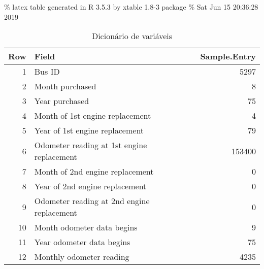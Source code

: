 \documentclass[12pt,a4paper]{article}
\newenvironment{Shaded}{\begin{snugshade}}{\end{snugshade}}
\newcommand{\CommentTok}[1]{\textcolor[rgb]{0.56,0.35,0.01}{\textit{#1}}}
\newcommand{\DataTypeTok}[1]{\textcolor[rgb]{0.13,0.29,0.53}{#1}}
\newcommand{\DecValTok}[1]{\textcolor[rgb]{0.00,0.00,0.81}{#1}}
\newcommand{\KeywordTok}[1]{\textcolor[rgb]{0.13,0.29,0.53}{\textbf{#1}}}
\newcommand{\NormalTok}[1]{#1}
\newcommand{\OperatorTok}[1]{\textcolor[rgb]{0.81,0.36,0.00}{\textbf{#1}}}
\newcommand{\StringTok}[1]{\textcolor[rgb]{0.31,0.60,0.02}{#1}}
\begin{document}
\begin{Shaded}
\end{Shaded}

\% latex table generated in R 3.5.3 by xtable 1.8-3 package \% Sat Jun
15 20:36:28 2019

\begin{table}[ht]
\centering
\begin{tabular}{rlr}
  \hline
Row & Field & Sample.Entry \\ 
  \hline
1 & Bus ID & 5297 \\ 
  2 & Month purchased & 8 \\ 
  3 & Year purchased & 75 \\ 
  4 & Month of 1st engine replacement & 4 \\ 
  5 & Year of 1st engine replacement & 79 \\ 
  6 & Odometer reading at 1st engine replacement & 153400 \\ 
  7 & Month of 2nd engine replacement & 0 \\ 
  8 & Year of 2nd engine replacement & 0 \\ 
  9 & Odometer reading at 2nd engine replacement & 0 \\ 
  10 & Month odometer data begins & 9 \\ 
  11 & Year odometer data begins & 75 \\ 
  12 & Monthly odometer reading & 4235 \\ 
   \hline
\end{tabular}
\caption{Dicionário de variáveis} 
\end{table}
\end{document}
